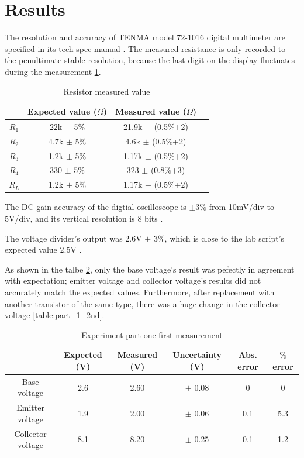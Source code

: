 \documentclass[11pt, a4paper]{article}
\begin{document}
\section{Results}

The resolution and accuracy of TENMA model 72-1016 digital multimeter are specified in its tech spec manual \cite{TENMA-72-1016}. The measured resistance is only recorded to the penultimate stable resolution, because the last digit on the display fluctuates during the measurement \ref{table:resistor_measured_value}.

\begin{table}[htbp]
\caption{Resistor measured value}
\label{table:resistor_measured_value}
\begin{center}
\begin{tabular}{|c|c|c|c|}
\hline
      & Expected value ($\Omega$) & Measured value ($\Omega$) \\ \hline
$R_1$ & 22k $\pm$ 5$\%$ & 21.9k $\pm$ (0.5$\%$+2) \\ \hline
$R_2$ & 4.7k $\pm$ 5$\%$ & 4.6k $\pm$ (0.5$\%$+2) \\ \hline
$R_3$ & 1.2k $\pm$ 5$\%$ & 1.17k $\pm$ (0.5$\%$+2) \\ \hline
$R_4$ & 330 $\pm$ 5$\%$ & 323 $\pm$ (0.8$\%$+3) \\ \hline
$R_L$ & 1.2k $\pm$ 5$\%$ & 1.17k $\pm$ (0.5$\%$+2) \\ \hline
\end{tabular}
\end{center}  
\end{table}

The DC gain accuracy of the digtial oscilloscope is $\pm$3$\%$ from 10mV/div to 5V/div, and its vertical resolution is 8 bits \cite{Tektronix-TBS1052B-EDU}.

The voltage divider's output was 2.6V $\pm$ 3$\%$, which is close to the lab script's expected value 2.5V \cite{lab_script}.

As shown in the talbe \ref{table:part_1_1st}, only the base voltage's result was pefectly in agreement with expectation; emitter voltage and collector voltage's results did not accurately match the expected values. Furthermore, after replacement with another transistor of the same type, there was a huge change in the collector voltage \ref{table:part_1_2nd}.

\begin{table}[htbp]
\caption{Experiment part one first measurement}
\label{table:part_1_1st}
\begin{center}
\begin{tabular}{|c|c|c|c|c|c|}
\hline
             & Expected (V) & Measured (V) & Uncertainty (V) & Abs. error & $\%$ error \\ \hline
Base voltage & 2.6 & 2.60 & $\pm$ 0.08 & 0 & 0 \\ \hline
Emitter voltage & 1.9 & 2.00 & $\pm$ 0.06 & 0.1 & 5.3 \\ \hline
Collector voltage & 8.1 & 8.20 & $\pm$ 0.25 & 0.1 & 1.2\\ \hline
\end{tabular}
\end{center}  
\end{table}
\end{document}
